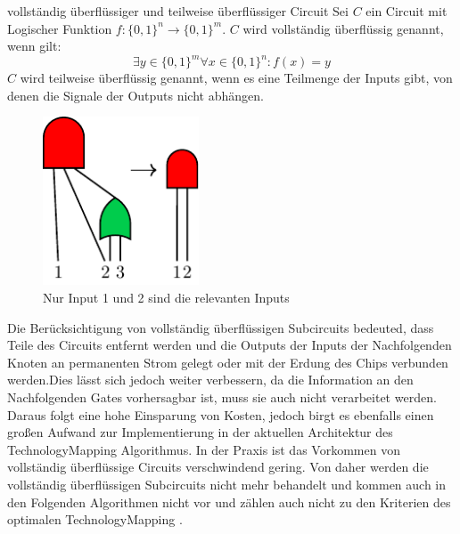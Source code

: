 \documentclass[11pt, a4paper, german]{article}
\newcommand{\TM}{TechnologyMapping }
\begin{document}
 \begin{definition}{vollständig überflüssiger und teilweise überflüssiger Circuit }
 	Sei $C$ ein Circuit mit Logischer Funktion $ f : \{ 0 , 1 \}^n \rightarrow \{ 0 , 1 \}^m $. $C$ wird vollständig überflüssig genannt, wenn gilt:
 	\[  \exists y \in \{0,1 \}^m \forall x \in \{ 0, 1\}^n : f(x) = y  \]
 	$C$ wird teilweise überflüssig genannt, wenn es eine Teilmenge der Inputs gibt, von denen die Signale der Outputs nicht abhängen.
 \end{definition}
 \begin{figure}
		\includegraphics[height = 5cm]{pictures/compiled/partly_redundant}
		\caption{Nur Input 1 und 2 sind die relevanten Inputs}
		\label{bild:partly_redundant}
\end{figure}
Die Berücksichtigung von vollständig überflüssigen Subcircuits bedeuted, dass Teile des Circuits entfernt werden und die Outputs der Inputs der Nachfolgenden Knoten an permanenten Strom gelegt oder mit der Erdung des Chips verbunden werden.Dies lässt sich jedoch weiter verbessern, da die Information an den Nachfolgenden Gates vorhersagbar ist, muss sie auch nicht verarbeitet werden. Daraus folgt eine hohe Einsparung von Kosten, jedoch birgt es ebenfalls einen großen Aufwand zur Implementierung in der aktuellen Architektur des \TM Algorithmus. In der Praxis ist das Vorkommen von  vollständig überflüssige Circuits verschwindend gering. Von daher werden die vollständig überflüssigen Subcircuits nicht mehr behandelt und kommen auch in den Folgenden Algorithmen nicht vor und zählen auch nicht zu den Kriterien des optimalen \TM. \\
 
\end{document}
